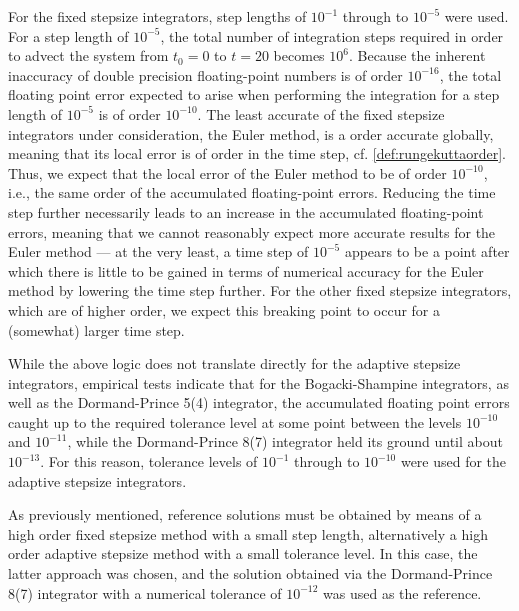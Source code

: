 For the fixed stepsize integrators, step lengths of $10^{-1}$ through to
$10^{-5}$ were used. For a step length of $10^{-5}$, the total number of
integration steps required in order to advect the system from $t_{0}=0$ to
$t=20$ becomes $10^{6}$. Because the inherent inaccuracy of double precision
floating-point numbers is of order $10^{-16}$, the total floating point
error expected to arise when performing the integration for a step length of
$10^{-5}$ is of order $10^{-10}$. The least accurate of the fixed stepsize
integrators under consideration, the Euler method, is a  order accurate
globally, meaning that its local error is of  order in the time step,
cf. \cref{def:rungekuttaorder}. Thus, we expect that the local error of the
Euler method to be of order $10^{-10}$, i.e., the same order of the accumulated
floating-point errors. Reducing the time step further necessarily leads to
an increase in the accumulated floating-point errors, meaning that we cannot
reasonably expect more accurate results for the Euler method --- at the very
least, a time step of $10^{-5}$ appears to be a point after which there is
little to be gained in terms of numerical accuracy for the Euler method by
lowering the time step further. For the other fixed stepsize integrators, which
are of higher order, we expect this breaking point to occur for a (somewhat)
larger time step.

While the above logic does not translate directly for the adaptive stepsize
integrators, empirical tests indicate that for the Bogacki-Shampine integrators,
as well as the Dormand-Prince 5(4) integrator, the accumulated floating point
errors caught up to the required tolerance level at some point between the
levels $10^{-10}$ and $10^{-11}$, while the Dormand-Prince 8(7) integrator held
its ground until about $10^{-13}$. For this reason, tolerance levels of
$10^{-1}$ through to $10^{-10}$ were used for the adaptive stepsize integrators.

As previously mentioned, reference solutions must be obtained by means of a
high order fixed stepsize method with a small step length, alternatively a high
order adaptive stepsize method with a small tolerance level. In this case, the
latter approach was chosen, and the solution obtained via the Dormand-Prince
8(7) integrator with a numerical tolerance of $10^{-12}$ was used as the
reference.


